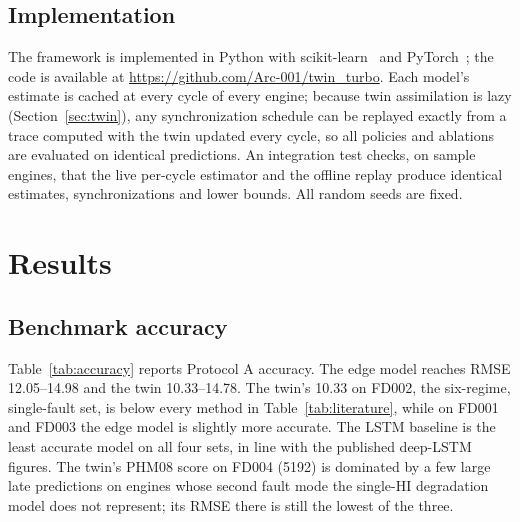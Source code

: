 \documentclass[pdflatex,sn-mathphys-num]{sn-jnl}
\gdef\repourl{\url{https://github.com/Arc-001/twin_turbo}}
\begin{document}
\subsection{Implementation}
The framework is implemented in Python with scikit-learn~\cite{pedregosa2011sklearn} and PyTorch~\cite{paszke2019pytorch}; the code is available at \repourl. Each model's estimate is cached at every cycle of every engine; because twin assimilation is lazy (Section~\ref{sec:twin}), any synchronization schedule can be replayed exactly from a trace computed with the twin updated every cycle, so all policies and ablations are evaluated on identical predictions. An integration test checks, on sample engines, that the live per-cycle estimator and the offline replay produce identical estimates, synchronizations and lower bounds. All random seeds are fixed.

\section{Results}\label{sec:results}

\subsection{Benchmark accuracy}
Table~\ref{tab:accuracy} reports Protocol A accuracy. The edge model reaches RMSE 12.05--14.98 and the twin 10.33--14.78. The twin's 10.33 on FD002, the six-regime, single-fault set, is below every method in Table~\ref{tab:literature}, while on FD001 and FD003 the edge model is slightly more accurate. The LSTM baseline is the least accurate model on all four sets, in line with the published deep-LSTM figures. The twin's PHM08 score on FD004 (5192) is dominated by a few large late predictions on engines whose second fault mode the single-HI degradation model does not represent; its RMSE there is still the lowest of the three.
\end{document}
